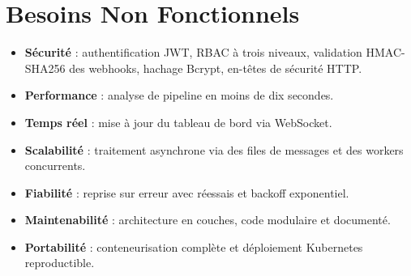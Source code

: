 \documentclass[12pt,a4paper,oneside]{report}
\begin{document}
\section{Besoins Non Fonctionnels}
\begin{itemize}[leftmargin=1.4em]
  \item \textbf{Sécurité} : authentification JWT, RBAC à trois niveaux, validation HMAC-SHA256 des webhooks, hachage Bcrypt, en-têtes de sécurité HTTP.
  \item \textbf{Performance} : analyse de pipeline en moins de dix secondes.
  \item \textbf{Temps réel} : mise à jour du tableau de bord via WebSocket.
  \item \textbf{Scalabilité} : traitement asynchrone via des files de messages et des workers concurrents.
  \item \textbf{Fiabilité} : reprise sur erreur avec réessais et backoff exponentiel.
  \item \textbf{Maintenabilité} : architecture en couches, code modulaire et documenté.
  \item \textbf{Portabilité} : conteneurisation complète et déploiement Kubernetes reproductible.
\end{itemize}
\end{document}
